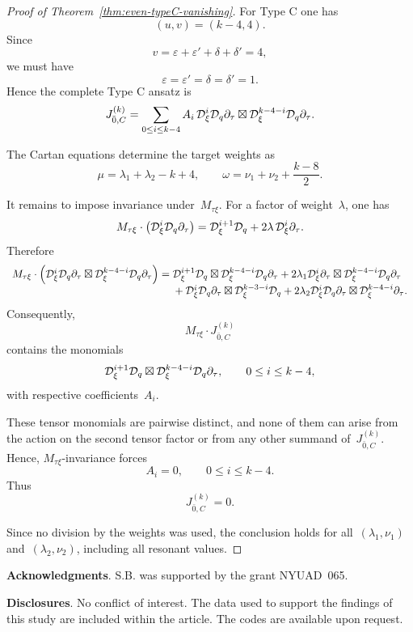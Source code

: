 \documentclass[12pt,a4paper]{amsart}
\theoremstyle{thm}
\theoremstyle{definition}
\newcommand {\Dq}{\cD_q}
\newcommand {\Dxi}{\cD_\xi}
\begin{document}
\begin{proof}[Proof of Theorem~\textup{\ref{thm:even-typeC-vanishing}}]
For Type C one has
\[
(u,v)=(k-4,4).
\]
Since
\[
v=\varepsilon+\varepsilon'+\delta+\delta'=4,
\]
we must have
\[
\varepsilon=\varepsilon'=\delta=\delta'=1.
\]
Hence the complete Type C ansatz is
\[
J_{\bar0,C}^{(k)}
=
\sum_{0\leq i\leq k-4}
A_i\,
\Dxi^i\Dq\partial_\tau\boxtimes \Dxi^{k-4-i}\Dq\partial_\tau.
\]

The Cartan equations determine the target weights as
\[
\mu=\lambda_1+\lambda_2-k+4,
\qquad
\omega=\nu_1+\nu_2+\frac{k-8}{2}.
\]

It remains to impose invariance under~\(M_{\tau\xi}\).
For a factor of weight~\(\lambda\), one has
\[
M_{\tau\xi}\cdot\left(\Dxi^i\Dq\partial_\tau\right)
=
\Dxi^{i+1}\Dq
+
2\lambda\,\Dxi^i\partial_\tau.
\]
Therefore
\[
\begin{array}{r@{}l}
M_{\tau\xi}\cdot
\left(
\Dxi^i\Dq\partial_\tau\boxtimes \Dxi^{k-4-i}\Dq\partial_\tau
\right)
={}&
\Dxi^{i+1}\Dq\boxtimes \Dxi^{k-4-i}\Dq\partial_\tau
+
2\lambda_1\Dxi^i\partial_\tau\boxtimes \Dxi^{k-4-i}\Dq\partial_\tau
\\
&{}+
\Dxi^i\Dq\partial_\tau\boxtimes \Dxi^{k-3-i}\Dq
+
2\lambda_2\Dxi^i\Dq\partial_\tau\boxtimes \Dxi^{k-4-i}\partial_\tau.
\end{array}
\]
Consequently,
\[
M_{\tau\xi}\cdot J_{\bar0,C}^{(k)}
\]
contains the monomials
\[
\Dxi^{i+1}\Dq\boxtimes \Dxi^{k-4-i}\Dq\partial_\tau,
\qquad
0\leq i\leq k-4,
\]
with respective coefficients~\(A_i\).

These tensor monomials are pairwise distinct, and none of them can
arise from the action on the second tensor factor or from any other
summand of~\(J_{\bar0,C}^{(k)}\). Hence, \(M_{\tau\xi}\)-invariance
forces
\[
A_i=0,
\qquad
0\leq i\leq k-4.
\]
Thus
\[
J_{\bar0,C}^{(k)}=0.
\]

Since no division by the weights was used, the conclusion holds for
all~\((\lambda_1,\nu_1)\) and~\((\lambda_2,\nu_2)\), including all
resonant values.
\end{proof}


 \textbf{Acknowledgments}.
S.B. was supported by the grant NYUAD~065.

 \textbf{Disclosures}. No conflict of interest. The data used to support the
findings of this study are included within the article. The codes are available upon
request.
\end{document}
